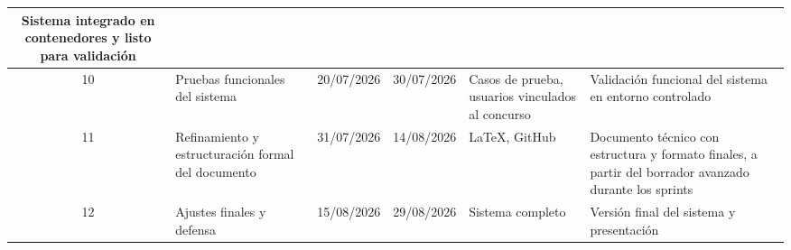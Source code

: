 \begin{table}[H]
\begin{tabular}{|c|p{3.5cm}|c|c|p{3cm}|p{3.5cm}|}
    Sistema integrado en contenedores y listo para validación \\
    \hline
    10 & Pruebas funcionales del sistema &
    20/07/2026 & 30/07/2026 &
    Casos de prueba, usuarios vinculados al concurso &
    Validación funcional del sistema en entorno controlado \\
    \hline
    11 & Refinamiento y estructuración formal del documento &
    31/07/2026 & 14/08/2026 &
    \LaTeX, GitHub &
    Documento técnico con estructura y formato finales, a partir del borrador avanzado durante los sprints \\
    \hline
    12 & Ajustes finales y defensa & 
    15/08/2026 & 29/08/2026 & 
    Sistema completo & 
    Versión final del sistema y presentación \\
    \hline
    \end{tabular}
\end{table}